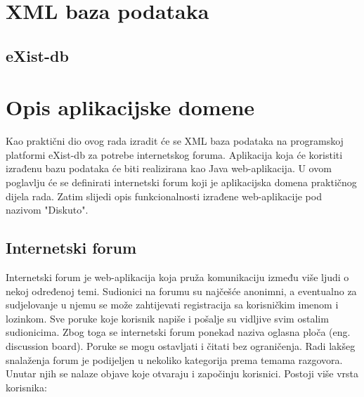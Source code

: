 \documentclass{foi}
\begin{document}
\chapter{XML baza podataka}
\section{eXist-db}

\chapter{Opis aplikacijske domene}

Kao praktični dio ovog rada izradit će se XML baza podataka na programskoj platformi eXist-db za potrebe internetskog foruma. Aplikacija koja će koristiti izrađenu bazu podataka će biti realizirana kao Java web-aplikacija. U ovom poglavlju će se definirati internetski forum koji je aplikacijska domena praktičnog dijela rada. Zatim slijedi opis funkcionalnosti izrađene web-aplikacije pod nazivom "Diskuto".

\section{Internetski forum}

Internetski forum je web-aplikacija koja pruža komunikaciju između više ljudi o nekoj određenoj temi. Sudionici na forumu su najčešće anonimni, a eventualno za sudjelovanje u njemu se može zahtijevati registracija sa korisničkim imenom i lozinkom.  Sve poruke koje korisnik napiše i pošalje su vidljive svim ostalim sudionicima. \cite{definitionInternetForum} Zbog toga se internetski forum ponekad naziva oglasna ploča (eng. discussion board). Poruke se mogu ostavljati i čitati bez ograničenja. Radi lakšeg snalaženja forum je podijeljen u nekoliko kategorija prema temama razgovora. Unutar njih se nalaze objave koje otvaraju i započinju korisnici. Postoji više vrsta korisnika:
\end{document}
